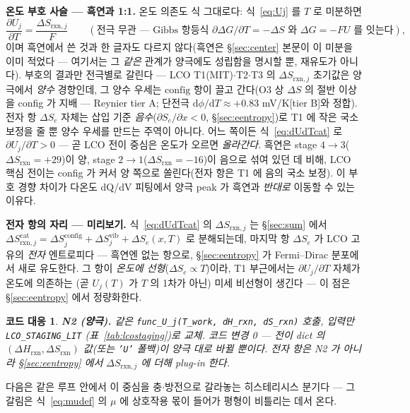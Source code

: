 \documentclass[11pt,a4paper]{article}
\newtheorem*{codebox}{코드 대응}
\newcommand{\dd}{\mathrm{d}}
\newcommand{\rxn}{\mathrm{rxn}}
\newcommand{\cat}{\mathrm{cat}}
\newcommand{\config}{\mathrm{config}}
\newcommand{\vib}{\mathrm{vib}}
\newcommand{\code}[1]{\texttt{#1}}
\begin{document}
\textbf{온도 부호 사슬 — 흑연과 1:1.} 온도 의존도 식 그대로다: 식~\eqref{eq:Uj} 를 $T$ 로 미분하면
\begin{equation}
\frac{\partial U_j}{\partial T}=\frac{\Delta S_{\rxn,j}}{F}
\qquad(\text{전극 무관 — Gibbs 항등식 }\partial\Delta G/\partial T=-\Delta S\text{ 와 }\Delta G=-FU\text{ 를 잇는다}),
\label{eq:dUdTcat}
\end{equation}
이며 흑연에서 쓴 것과 한 글자도 다르지 않다(흑연은 \S\ref{sec:center} 본문이 이 미분을 이미 적었다 — 여기서는 그 \emph{같은}
관계가 양극에도 성립함을 명시할 뿐, 재유도가 아니다). 부호의 결과만 전극별로 갈린다 — LCO T1(MIT)$\cdot$T2$\cdot$T3 의
$\Delta S_{\rxn,j}$ 초기값은 양극에서 \emph{양수} 경향인데, 그 양수 우세는 $\config$ 항이 끌고 간다(O3 상 $\Delta S$ 의
절반 이상을 config 가 지배 — Reynier tier A; 단전극 $\dd\phi/\dd T\approx+0.83$ mV/K[tier B]와 정합). 전자 항 $\Delta S_e$
자체는 삽입 기준 \emph{음수}($\partial S_e/\partial x<0$, \S\ref{sec:eentropy})로 T1 에 작은 국소 보정을 줄 뿐 양수 우세를
만드는 주역이 아니다. 어느 쪽이든 식~\eqref{eq:dUdTcat} 로 $\partial U_j/\partial T>0$ — 곧 LCO 전이 중심은 온도가 오르면
\emph{올라간다}. 흑연은 stage $4\!\to\!3$($\Delta S_\rxn=+29$)이 양, stage $2\!\to\!1$($\Delta S_\rxn=-16$)이 음으로 섞여
있던 데 비해, LCO 핵심 전이는 config 가 커서 양 쪽으로 쏠린다(전자 항은 T1 에 음의 국소 보정). 이 부호 경향 차이가
다온도 dQ/dV 피팅에서 양극 peak 가 흑연과 \emph{반대로} 이동할 수 있는 이유다.

\textbf{전자 항의 자리 — 미리보기.} 식~\eqref{eq:dUdTcat} 의 $\Delta S_{\rxn,j}$ 는 \S\ref{sec:sum} 에서
$\Delta S_{\rxn,j}^\cat=\Delta S^\config_j+\Delta S^\vib_j+\Delta S_e(x,T)$ 로 분해되는데, 마지막 항 $\Delta S_e$ 가
LCO 고유의 \emph{전자} 엔트로피다 — 흑연엔 없는 항으로, \S\ref{sec:eentropy} 가 Fermi--Dirac 분포에서 새로 유도한다.
그 항이 \emph{온도에 선형}($\Delta S_e\propto T$)이라, T1 부근에서는 $\partial U_j/\partial T$ 자체가 온도에 의존하는
(곧 $U_j(T)$ 가 $T$ 의 1차가 아닌) 미세 비선형이 생긴다 — 이 점은 \S\ref{sec:eentropy} 에서 정량화한다.

\begin{codebox}
\textbf{N2 (양극).} 같은 \code{func\_U\_j(T\_work, dH\_rxn, dS\_rxn)} 호출, 입력만 \code{LCO\_STAGING\_LIT}
(표~\ref{tab:lcostaging})로 교체. 코드 변경 0 — 전이 dict 의 $(\Delta H_\rxn,\Delta S_\rxn)$ 값(또는 \code{'U'} 폴백)이
양극 대로 바뀔 뿐이다. 전자 항은 N2 가 아니라 \S\ref{sec:eentropy} 에서 $\Delta S_{\rxn,j}$ 에 더해 plug-in 한다.
\end{codebox}

다음은 같은 루프 안에서 이 중심을 충$\cdot$방전으로 갈라놓는 히스테리시스 분기다 — 그 갈림은 식~\eqref{eq:mudef} 의
$\mu$ 에 상호작용 몫이 들어가 평형이 비틀리는 데서 온다.
\end{document}

